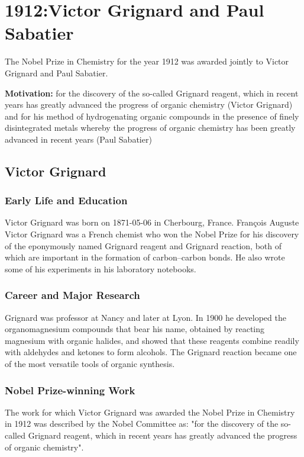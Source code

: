 \chapter{1912:Victor Grignard and Paul Sabatier}
\label{chap:chemistry1912}

The Nobel Prize in Chemistry for the year 1912 was awarded jointly to Victor Grignard and Paul Sabatier.

\textbf{Motivation:}
for the discovery of the so-called Grignard reagent, which in recent years has greatly advanced the progress of organic chemistry (Victor Grignard) and for his method of hydrogenating organic compounds in the presence of finely disintegrated metals whereby the progress of organic chemistry has been greatly advanced in recent years (Paul Sabatier)

\section{Victor Grignard}

\subsection*{Early Life and Education}

Victor Grignard was born on 1871-05-06 in Cherbourg, France.
François Auguste Victor Grignard was a French chemist who won the Nobel Prize for his discovery of the eponymously named Grignard reagent and Grignard reaction, both of which are important in the formation of carbon–carbon bonds. He also wrote some of his experiments in his laboratory notebooks.

\subsection*{Career and Major Research}

Grignard was professor at Nancy and later at Lyon. In 1900 he developed the organomagnesium compounds that bear his name, obtained by reacting magnesium with organic halides, and showed that these reagents combine readily with aldehydes and ketones to form alcohols. The Grignard reaction became one of the most versatile tools of organic synthesis.

\subsection*{Nobel Prize-winning Work}

The work for which Victor Grignard was awarded the Nobel Prize in Chemistry in 1912 was described by the Nobel Committee as: "for the discovery of the so-called Grignard reagent, which in recent years has greatly advanced the progress of organic chemistry".

